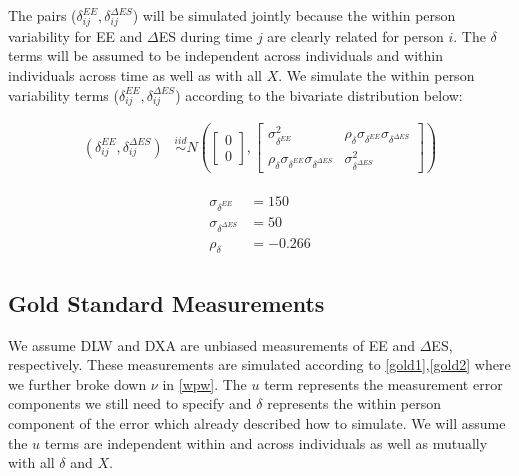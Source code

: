 \documentclass[11pt]{article}\usepackage[]{graphicx}\usepackage[]{color}
\begin{document}
The pairs ($\delta_{ij}^{EE},\delta_{ij}^{\Delta ES}$) will be simulated jointly because the within person variability for EE and $\Delta$ES during time $j$ are clearly related for person $i$. The $\delta$ terms will be assumed to be independent across individuals and within individuals across time as well as with all $X$. We simulate the within person variability terms ($\delta_{ij}^{EE},\delta_{ij}^{\Delta ES}$) according to the bivariate distribution below:


\begin{align}
  \label{delta}
  (\delta_{ij}^{EE}, \delta_{ij}^{\Delta ES}) &\overset{iid}{\sim} N\left(
  \begin{bmatrix}
  0\\
  0
  \end{bmatrix}
  ,
  \begin{bmatrix}
  \sigma_{\delta^{EE}}^2 & \rho_{\delta}\sigma_{\delta^{EE}}\sigma_{\delta^{\Delta ES}} \\
   \rho_{\delta}\sigma_{\delta^{EE}}\sigma_{\delta^{\Delta ES}} & \sigma_{\delta^{\Delta ES}}^2
   \end{bmatrix}
  \right)
\end{align}


  \begin{align}
  \begin{split}
    \label{withinvar5}
  \sigma_{\delta^{EE}} &= 150\\
  \sigma_{\delta^{\Delta ES}} &= 50 \\
  \rho_{\delta} &= -0.266
  \end{split}
  \end{align}


\subsection{Gold Standard Measurements}

We assume DLW and DXA are unbiased measurements of EE and $\Delta$ES, respectively. These measurements are simulated according to \eqref{gold1},\eqref{gold2} where we further broke down $\nu$ in \eqref{wpw}.  The $u$ term represents the measurement error components we still need to specify and $\delta$ represents the within person component of the error which already described how to simulate. We will assume the $u$ terms are independent within and across individuals as well as mutually with all $\delta$ and $X$. 
\end{document}
